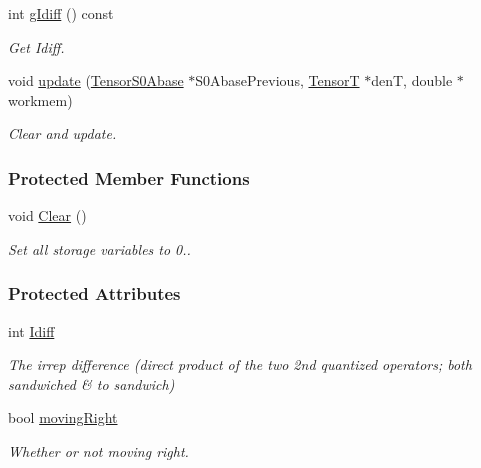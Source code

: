 \begin{DoxyCompactItemize}
int \hyperlink{classCheMPS2_1_1TensorS0Abase_a5a752899bbe8f1d28bfecc0db45dc715}{g\-Idiff} () const 
\begin{DoxyCompactList}\small\item\em Get Idiff. \end{DoxyCompactList}\item 
void \hyperlink{classCheMPS2_1_1TensorS0Abase_ac948b1b4b9a32f5dddf707de1a86001d}{update} (\hyperlink{classCheMPS2_1_1TensorS0Abase}{Tensor\-S0\-Abase} $\ast$S0\-Abase\-Previous, \hyperlink{classCheMPS2_1_1TensorT}{Tensor\-T} $\ast$den\-T, double $\ast$workmem)
\begin{DoxyCompactList}\small\item\em Clear and update. \end{DoxyCompactList}\end{DoxyCompactItemize}
\subsubsection*{Protected Member Functions}
\begin{DoxyCompactItemize}
\item 
\hypertarget{classCheMPS2_1_1TensorS0Abase_a3d99ca8908161c3f2558ac0c860e8450}{void \hyperlink{classCheMPS2_1_1TensorS0Abase_a3d99ca8908161c3f2558ac0c860e8450}{Clear} ()}\label{classCheMPS2_1_1TensorS0Abase_a3d99ca8908161c3f2558ac0c860e8450}

\begin{DoxyCompactList}\small\item\em Set all storage variables to 0.. \end{DoxyCompactList}\end{DoxyCompactItemize}
\subsubsection*{Protected Attributes}
\begin{DoxyCompactItemize}
\item 
\hypertarget{classCheMPS2_1_1TensorS0Abase_aa0936f93318ecc4d6b9db45d34d8380b}{int \hyperlink{classCheMPS2_1_1TensorS0Abase_aa0936f93318ecc4d6b9db45d34d8380b}{Idiff}}\label{classCheMPS2_1_1TensorS0Abase_aa0936f93318ecc4d6b9db45d34d8380b}

\begin{DoxyCompactList}\small\item\em The irrep difference (direct product of the two 2nd quantized operators; both sandwiched \& to sandwich) \end{DoxyCompactList}\item 
\hypertarget{classCheMPS2_1_1TensorS0Abase_ab6090ca778e8e1efdfcefedaf91156ec}{bool \hyperlink{classCheMPS2_1_1TensorS0Abase_ab6090ca778e8e1efdfcefedaf91156ec}{moving\-Right}}\label{classCheMPS2_1_1TensorS0Abase_ab6090ca778e8e1efdfcefedaf91156ec}

\begin{DoxyCompactList}\small\item\em Whether or not moving right. \end{DoxyCompactList}\end{DoxyCompactItemize}


